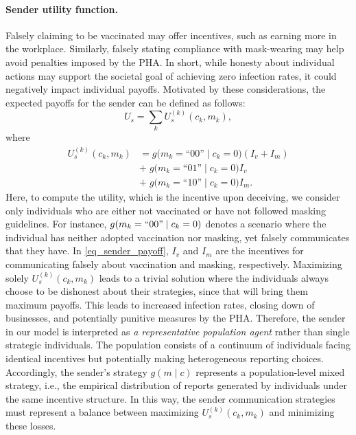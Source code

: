 \documentclass[sigconf,review]{acmart}
\begin{document}
\paragraph{Sender utility function.} Falsely claiming to be vaccinated may offer incentives, such as earning more in the workplace. Similarly, falsely stating compliance with mask-wearing may help avoid penalties imposed by the PHA. In short, while honesty about individual actions may support the societal goal of achieving zero infection rates, it could negatively impact individual payoffs. Motivated by these considerations, the expected payoffs for the sender can be defined as follows:
\begin{equation}
 U_s = \sum\limits_k U_s^{(k)}(c_k, m_k), \label{eq:utility}
\end{equation}
where 
\begin{equation}
\begin{aligned}
U_s^{(k)}(c_k, m_k) &= g\big(m_k = \text{``00''} \mid c_k = 0\big)(I_v + I_m) \\
& +\; g\big(m_k = \text{``01''} \mid c_k = 0\big) I_v \\
& +\; g\big(m_k = \text{``10''} \mid c_k = 0\big) I_m.
\end{aligned}
\label{eq_sender_payoff}
\end{equation}
\noindent
Here, to compute the utility, which is the incentive upon deceiving, we consider only individuals who are either not vaccinated or have not followed masking guidelines. For instance, \( g(m_k = ``00" \mid c_k=0) \) denotes a scenario where the individual has neither adopted vaccination nor masking, yet falsely communicates that they have. 
In \eqref{eq_sender_payoff}, $I_v$ and $I_m$ are the incentives for communicating falsely about vaccination and masking, respectively. Maximizing solely $U_s^{(k)}(c_k,m_k)$ leads to a trivial solution where the individuals always choose to be dishonest about their strategies, since that will bring them maximum payoffs. %
This leads to  increased infection rates, closing down of businesses, and potentially punitive measures by the PHA.
Therefore, the sender in our model is interpreted as \emph{a representative population agent} rather than single strategic individuals. The population consists of a continuum of individuals facing identical incentives but potentially making heterogeneous reporting choices. Accordingly, the sender’s strategy $g(m \mid c)$ represents a population-level mixed strategy, i.e., the empirical distribution of reports generated by individuals under the same incentive structure. In this way, the sender communication strategies must represent a balance between maximizing $U_s^{(k)}(c_k,m_k)$ and minimizing these losses. 
\end{document}
